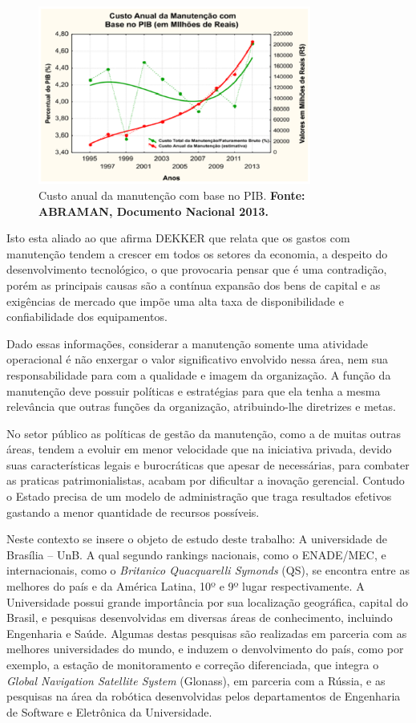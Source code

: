 \graphicspath{{figuras/}}
\begin{figure}[h]
\centering
\includegraphics[width=0.8\textwidth]{dados_pib_pesquisa_intro.eps}
\caption{Custo anual da manutenção com base no PIB. \textbf{Fonte: ABRAMAN, Documento Nacional 2013.}}
\label{custo_anual_2013}
\end{figure}


Isto esta aliado ao que afirma DEKKER \cite{dekker1998} que relata que os gastos com manutenção tendem a crescer em todos os setores da economia, a despeito do desenvolvimento tecnológico, o que provocaria pensar que é uma contradição, porém as principais causas são a contínua expansão dos bens de capital e as exigências de mercado que impõe uma alta taxa de disponibilidade e confiabilidade dos equipamentos.

Dado essas informações, considerar a manutenção somente uma atividade operacional é não enxergar o valor significativo envolvido nessa área, nem sua responsabilidade para com a qualidade e imagem da organização. A função da manutenção deve possuir políticas e estratégias para que ela tenha a mesma relevância que outras funções da organização, atribuindo-lhe diretrizes e metas.	

No setor público as políticas de gestão da manutenção, como a de muitas outras áreas, tendem a evoluir em menor velocidade que na iniciativa privada, devido suas características legais e burocráticas que apesar de necessárias, para combater as praticas patrimonialistas, acabam por dificultar a inovação gerencial. Contudo o Estado precisa de um modelo de administração que traga resultados efetivos gastando a menor quantidade de recursos possíveis.

Neste contexto se insere o objeto de estudo deste trabalho: A universidade de Brasília – UnB. A qual segundo rankings nacionais, como o ENADE/MEC, e internacionais, como o \emph{Britanico Quacquarelli Symonds} (QS), se encontra entre as melhores do país e da América Latina, 10º e 9º lugar respectivamente. A Universidade possui grande importância por sua localização geográfica, capital do Brasil, e pesquisas desenvolvidas em diversas áreas de conhecimento, incluindo Engenharia e Saúde. Algumas destas pesquisas são realizadas em parceria com as melhores universidades do mundo, e induzem o denvolvimento do país, como por exemplo, a estação de monitoramento e correção diferenciada, que integra o \emph{Global Navigation Satellite System} (Glonass), em parceria com a Rússia, e as pesquisas na área da robótica desenvolvidas pelos departamentos de Engenharia de Software e Eletrônica da Universidade.

